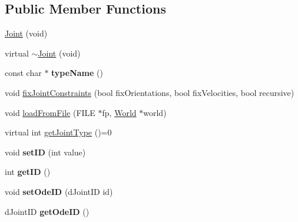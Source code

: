 \subsection*{Public Member Functions}
\begin{DoxyCompactItemize}
\item 
\hyperlink{classCartWheel_1_1Physics_1_1Joint_ad391790cfe3d76bae3d7a78a4dd8f1c5}{Joint} (void)
\item 
virtual \hyperlink{classCartWheel_1_1Physics_1_1Joint_ac9749eeeac49e9861554f2d580cc020d}{$\sim$Joint} (void)
\item 
\hypertarget{classCartWheel_1_1Physics_1_1Joint_a4f22fced366fe091e2d5d3867371a1d4}{
const char $\ast$ {\bfseries typeName} ()}
\label{classCartWheel_1_1Physics_1_1Joint_a4f22fced366fe091e2d5d3867371a1d4}

\item 
void \hyperlink{classCartWheel_1_1Physics_1_1Joint_a7939e7b1b3fefec4080687acfcc3a1a4}{fixJointConstraints} (bool fixOrientations, bool fixVelocities, bool recursive)
\item 
void \hyperlink{classCartWheel_1_1Physics_1_1Joint_a907c88d9f5136fb1b6d911d9993f243d}{loadFromFile} (FILE $\ast$fp, \hyperlink{classCartWheel_1_1Physics_1_1World}{World} $\ast$world)
\item 
virtual int \hyperlink{classCartWheel_1_1Physics_1_1Joint_a6940878e260534a3803b14aa697b88f7}{getJointType} ()=0
\item 
\hypertarget{classCartWheel_1_1Physics_1_1Joint_a729d790d151a3cd6cd27f0da460b5b9a}{
void {\bfseries setID} (int value)}
\label{classCartWheel_1_1Physics_1_1Joint_a729d790d151a3cd6cd27f0da460b5b9a}

\item 
\hypertarget{classCartWheel_1_1Physics_1_1Joint_a484ed2a0aa64b9f64284140808f2ff3a}{
int {\bfseries getID} ()}
\label{classCartWheel_1_1Physics_1_1Joint_a484ed2a0aa64b9f64284140808f2ff3a}

\item 
\hypertarget{classCartWheel_1_1Physics_1_1Joint_af8c2adcd9e0a311b2e6d817111d3c135}{
void {\bfseries setOdeID} (dJointID id)}
\label{classCartWheel_1_1Physics_1_1Joint_af8c2adcd9e0a311b2e6d817111d3c135}

\item 
\hypertarget{classCartWheel_1_1Physics_1_1Joint_ad95c4f4e64e439cfd4e6412fe5e42361}{
dJointID {\bfseries getOdeID} ()}
\label{classCartWheel_1_1Physics_1_1Joint_ad95c4f4e64e439cfd4e6412fe5e42361}


\end{DoxyCompactItemize}
